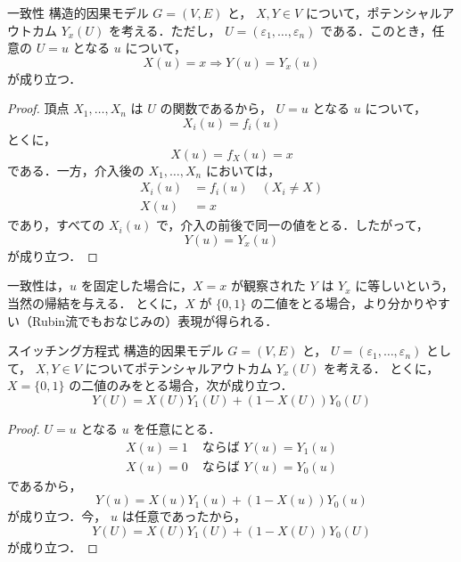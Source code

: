 \documentclass[uplatex, dvipdfmx]{jsarticle}
\begin{document}
\begin{prop}[label={prop:corresponding}]{一致性}
  構造的因果モデル $G = (V, E)$ と， $X, Y \in V$ について，ポテンシャルアウトカム $Y_x(U)$ を考える．ただし， $U = (\varepsilon_1, \dots, \varepsilon_n)$ である．このとき，任意の $U=u$ となる $u$ について，
  \begin{equation}
    X(u) = x \Rightarrow Y(u) = Y_x(u)
  \end{equation}
  が成り立つ．
\end{prop}

\begin{proof}
  頂点 $X_1, \dots, X_n$ は $U$ の関数であるから， $U=u$ となる $u$ について，
  \begin{equation}
    X_i(u) = f_i(u)
  \end{equation}
  とくに，
  \begin{equation}
    X(u) = f_X(u) = x
  \end{equation}
  である．一方，介入後の $X_1, \dots, X_n$ においては，
  \begin{align}
    X_i(u) &= f_i(u) \quad (X_i \neq X) \\
    X(u) &= x
  \end{align}
  であり，すべての $X_i(u)$ で，介入の前後で同一の値をとる．したがって，
  \begin{equation}
    Y(u) = Y_x(u)
  \end{equation}
  が成り立つ．
\end{proof}

一致性は，$u$ を固定した場合に，$X=x$ が観察された $Y$ は $Y_x$ に等しいという，当然の帰結を与える．
とくに，$X$ が $\{0, 1\}$ の二値をとる場合，より分かりやすい（Rubin流でもおなじみの）表現が得られる．

\begin{cor}{スイッチング方程式}
  構造的因果モデル $G = (V, E)$ と， $U = (\varepsilon_1, \dots, \varepsilon_n)$ として， $X, Y \in V$ についてポテンシャルアウトカム $Y_x(U)$ を考える．
  とくに， $X = \{0, 1\}$ の二値のみをとる場合，次が成り立つ．
\begin{equation}
    Y(U) = X(U) Y_1(U) + (1 - X(U)) Y_0(U)
  \end{equation}
\end{cor}

\begin{proof}
  $U=u$ となる $u$ を任意にとる．
  \begin{align}
    X(u) = 1 &\text{ ならば } Y(u) = Y_1(u) \\
    X(u) = 0 &\text{ ならば } Y(u) = Y_0(u)
  \end{align}
  であるから，
  \begin{equation}
    Y(u) = X(u) Y_1(u) + (1 - X(u)) Y_0(u)
  \end{equation}
  が成り立つ．今， $u$ は任意であったから，
  \begin{equation}
    Y(U) = X(U) Y_1(U) + (1 - X(U)) Y_0(U)
  \end{equation}
  が成り立つ．
\end{proof}
\end{document}
